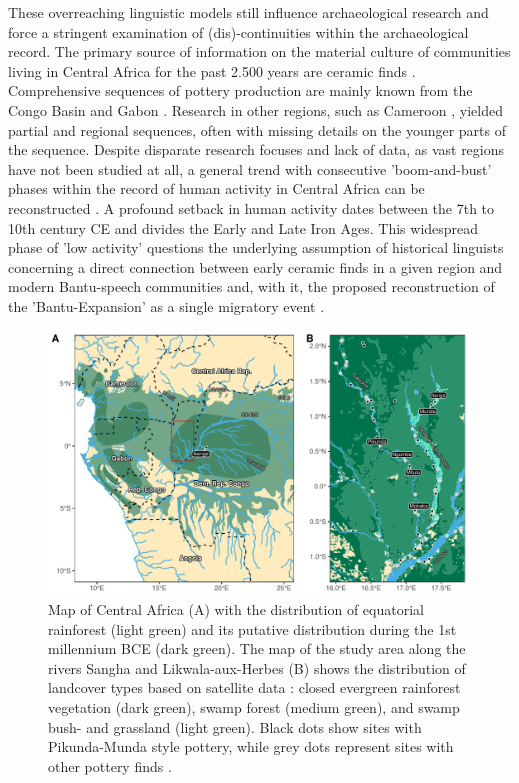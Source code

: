 \documentclass[smallextended,natbib]{svjour3}       %
\begin{document}
These overreaching linguistic models still influence archaeological research \citep{Eggert.2005,Eggert.2012,Eggert.2016a} and force a stringent examination of (dis)-continuities within the archaeological record. The primary source of information on the material culture of communities living in Central Africa for the past 2.500 years are ceramic finds \citep{Eggert.2014}. Comprehensive sequences of pottery production are mainly known from the Congo Basin \citep{Wotzka.1995,Seidensticker.2021e} and Gabon \citep{Clist.20042005}. Research in other regions, such as Cameroon \citep{GouemGouem.20102011,NlendNlend.20132014}, yielded partial and regional sequences, often with missing details on the younger parts of the sequence. Despite disparate research focuses and lack of data, as vast regions have not been studied at all, a general trend with consecutive 'boom-and-bust' phases within the record of human activity in Central Africa can be reconstructed \citep{Oslisly.1998,Oslisly.2013,Oslisly.2013b,Saulieu.2017,deSaulieu.2021a,Seidensticker.2021}. A profound setback in human activity dates between the 7th to 10th century CE and divides the Early and Late Iron Ages. This widespread phase of 'low activity' \citep[Fig. 2]{Seidensticker.2021} questions the underlying assumption of historical linguists concerning a direct connection between early ceramic finds in a given region and modern Bantu-speech communities \citep{Grollemund.2015,Bostoen.2015} and, with it, the proposed reconstruction of the 'Bantu-Expansion' as a single migratory event \citep{Currie.2013,Koile.2022,Grollemund.2023}.

\begin{figure}[!tb]
	\includegraphics[width=\textwidth]{Fig_Map.pdf}
	\caption{Map of Central Africa (A) with the distribution of equatorial rainforest \citep{White.1983} (light green) and its putative distribution during the 1st millennium BCE \citep{Bremond.2017,Maley.2017} (dark green). The map of the study area along the rivers Sangha and Likwala-aux-Herbes (B) shows the distribution of landcover types based on satellite data \citep{Mayaux.2003}: closed evergreen rainforest vegetation (dark green), swamp forest (medium green), and swamp bush- and grassland (light green). Black dots show sites with Pikunda-Munda style pottery, while grey dots represent sites with other pottery finds \citep[11 Fig.~1, 119 Fig.~49]{Seidensticker.2021e}.}
	\label{fig:map}
\end{figure}
\end{document}
